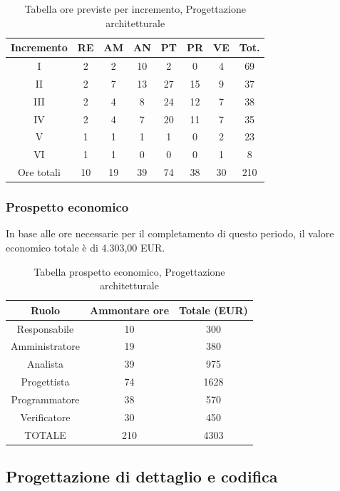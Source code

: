 \begin{table}[h]
	\caption{Tabella ore previste per incremento, Progettazione architetturale}  
	\begin{center}
		\begin{tabular}{ |c|c|c|c|c|c|c|c|  }
			\hline
			Incremento 		& RE 	& AM 	& AN 	& PT 	& PR 	& VE 	& Tot.\\
			\hline\hline
			I		& 2 		& 2			& 10 	& 2 	& 0 		& 4 		& 69\\
			II		& 2 		& 7 		& 13 	& 27	& 15 		& 9 		& 37\\
			III		& 2 		& 4 		& 8 	& 24	& 12 		& 7 		& 38\\
			IV		& 2 		& 4 		& 7 	& 20 	& 11 		& 7 		& 35\\
			V		& 1 		& 1 		& 1 	& 1		& 0 		& 2	 		& 23\\
			VI		& 1 		& 1 		& 0 	& 0 	& 0 		& 1 		& 8\\
			\hline\hline
			Ore totali		& 10		& 19		& 39 	& 74	 	& 38 	& 30 	& 210\\
			\hline
		\end{tabular}
	\end{center}
\end{table}

\subsubsection{Prospetto economico}
In base alle ore necessarie per il completamento di questo periodo, il valore economico totale è di 4.303,00 EUR.
\begin{table}[h]
	\caption{Tabella prospetto economico, Progettazione architetturale}  
\begin{center}
\begin{tabular}{ |c|c|c|  }
 \hline
 Ruolo 		& Ammontare ore 	& Totale (EUR)\\
 	\hline
 \hline
 	Responsabile	& 10 	& 300\\
	Amministratore	& 19		& 380\\
	Analista		& 39 	& 975\\
	Progettista		& 74		& 1628\\
	Programmatore	& 38		& 570\\
	Verificatore	& 30 	& 450\\
 \hline\hline
 TOTALE		& 210		& 4303\\
  \hline
\end{tabular}
\end{center}
\end{table}
\newpage
\subsection{Progettazione di dettaglio e codifica}
